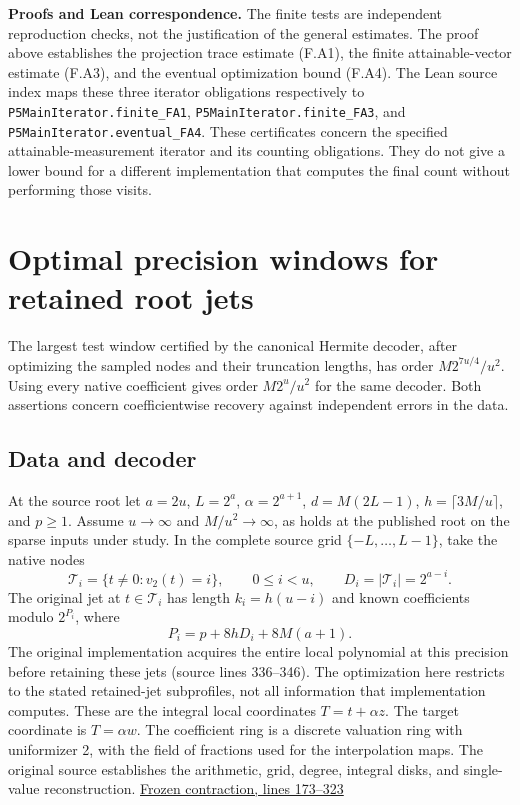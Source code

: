 \documentclass[
  11pt,
]{article}
\begin{document}
\textbf{Proofs and Lean correspondence.} The finite tests are independent
reproduction checks, not the justification of the general estimates.
The proof above establishes the projection trace estimate (F.A1),
the finite attainable-vector estimate (F.A3), and the eventual
optimization bound (F.A4). The Lean source index maps these three
iterator obligations respectively to
\nolinkurl{P5MainIterator.finite_FA1},
\nolinkurl{P5MainIterator.finite_FA3}, and
\nolinkurl{P5MainIterator.eventual_FA4}.
These certificates concern the specified attainable-measurement
iterator and its counting obligations. They do not give a lower bound
for a different implementation that computes the final count without
performing those visits.

\section{Optimal precision windows for retained root
jets}\label{optimal-precision-windows-for-retained-root-jets}

The largest test window certified by the canonical Hermite decoder,
after optimizing the sampled nodes and their truncation lengths, has
order \(M2^{7u/4}/u^2\). Using every native coefficient gives order
\(M2^u/u^2\) for the same decoder. Both assertions concern
coefficientwise recovery against independent errors in the data.

\subsection{Data and decoder}\label{data-and-decoder}

At the source root let \(a=2u\), \(L=2^a\), \(\alpha=2^{a+1}\),
\(d=M(2L-1)\), \(h=\lceil3M/u\rceil\), and \(p\ge1\). Assume
\(u\to\infty\) and \(M/u^2\to\infty\), as holds at the published root on
the sparse inputs under study. In the complete source grid
\(\{-L,\ldots,L-1\}\), take the native nodes \[
 \mathcal T_i=\{t\ne0:v_2(t)=i\},\qquad
 0\le i<u,\qquad D_i=|\mathcal T_i|=2^{a-i}.
\] The original jet at \(t\in\mathcal T_i\) has length \(k_i=h(u-i)\)
and known coefficients modulo \(2^{P_i}\), where \[
 P_i=p+8hD_i+8M(a+1).
\] The original implementation acquires the entire local polynomial at
this precision before retaining these jets (source lines 336--346). The
optimization here restricts to the stated retained-jet subprofiles, not
all information that implementation computes. These are the integral
local coordinates \(T=t+\alpha z\). The target coordinate is
\(T=\alpha w\). The coefficient ring is a discrete valuation ring with
uniformizer 2, with the field of fractions used for the interpolation
maps. The original source establishes the arithmetic, grid, degree,
integral disks, and single-value reconstruction.
\href{https://github.com/openai/math/blob/main/preprints/The-Exponential-Time-Hypothesis-is-False-October-25-2026/build/quantitative-contraction.tex\#L173-L323}{Frozen
contraction, lines 173--323}
\end{document}
